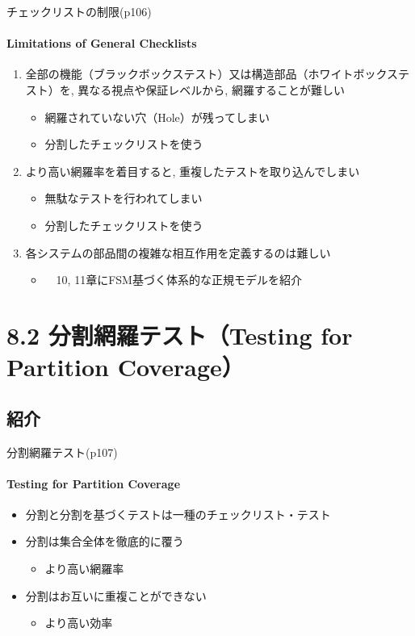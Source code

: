 \begin{frame}{チェックリストの制限(p106)}
\framesubtitle{Limitations of General Checklists}
\begin{enumerate}
\item 全部の機能（ブラックボックステスト）又は構造部品（ホワイトボックステスト）を, 異なる視点や保証レベルから, 網羅することが難しい
    \begin{itemize}
    \item 網羅されていない穴（Hole）が残ってしまい
    \item<uncover@3-|alert@3> 分割したチェックリストを使う
    \end{itemize}
\item より高い網羅率を着目すると, 重複したテストを取り込んでしまい
    \begin{itemize}
    \item 無駄なテストを行われてしまい
    \item<uncover@3-|alert@3> 分割したチェックリストを使う
    \end{itemize}
\item 各システムの部品間の複雑な相互作用を定義するのは難しい
    \begin{itemize}
    \item<uncover@2-|alert@2>　10, 11章にFSM基づく体系的な正規モデルを紹介
     
    \end{itemize}
\end{enumerate}
\end{frame}
\section{8.2 分割網羅テスト（Testing for Partition Coverage）}
\subsection{紹介}
\begin{frame}{分割網羅テスト(p107)}
\framesubtitle{Testing for Partition Coverage}
\begin{itemize}
\item 分割と分割を基づくテストは一種のチェックリスト・テスト
\item 分割は集合全体を徹底的に覆う　 
    \begin{itemize}
    \item より高い\alert{網羅率}
    \end{itemize}
\item 分割はお互いに重複ことができない
    \begin{itemize}
    \item より高い\alert{効率}
    \end{itemize}
\end{itemize}
\end{frame}
